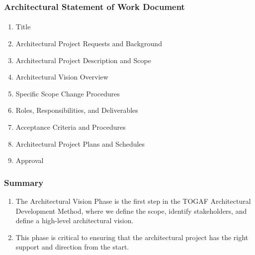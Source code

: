 \documentclass[aspectratio=169, table]{beamer}
\begin{document}
    \begin{frame}
        \frametitle{Architectural Statement of Work Document}
        \framesubtitle{\hspace{1cm}}
        \vspace{20pt}
        \begin{enumerate}
            \item Title
            \item Architectural Project Requests and Background
            \item Architectural Project Description and Scope
            \item Architectural Vision Overview
            \item Specific Scope Change Procedures
            \item Roles, Responsibilities, and Deliverables
            \item Acceptance Criteria and Procedures
            \item Architectural Project Plans and Schedules
            \item Approval
        \end{enumerate}
    \end{frame}

    \begin{frame}
        \frametitle{Summary}
        \begin{enumerate}
            \item The Architectural Vision Phase is the first step in the TOGAF Architectural Development Method, where we define the scope, identify stakeholders, and define a high-level architectural vision.
            \item This phase is critical to ensuring that the architectural project has the right support and direction from the start.
        \end{enumerate}

    \end{frame}
\end{document}
